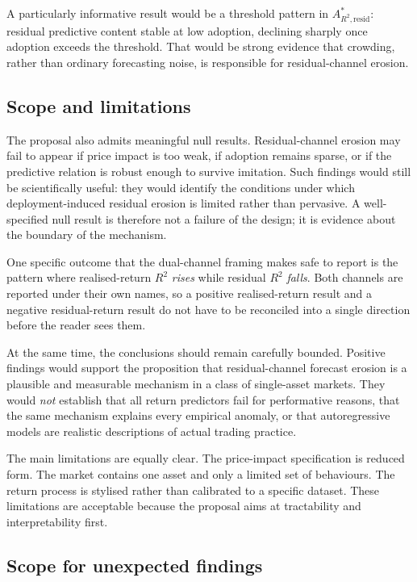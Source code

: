 \documentclass[11pt]{article}
\begin{document}
A particularly informative result would be a threshold pattern in $A^{*}_{R^{2},\mathrm{resid}}$: residual predictive content stable at low adoption, declining sharply once adoption exceeds the threshold. That would be strong evidence that crowding, rather than ordinary forecasting noise, is responsible for residual-channel erosion.

\subsection{Scope and limitations}

The proposal also admits meaningful null results. Residual-channel erosion may fail to appear if price impact is too weak, if adoption remains sparse, or if the predictive relation is robust enough to survive imitation. Such findings would still be scientifically useful: they would identify the conditions under which deployment-induced residual erosion is limited rather than pervasive. A well-specified null result is therefore not a failure of the design; it is evidence about the boundary of the mechanism.

One specific outcome that the dual-channel framing makes safe to report is the pattern where realised-return $R^{2}$ \emph{rises} while residual $R^{2}$ \emph{falls}. Both channels are reported under their own names, so a positive realised-return result and a negative residual-return result do not have to be reconciled into a single direction before the reader sees them.

At the same time, the conclusions should remain carefully bounded. Positive findings would support the proposition that residual-channel forecast erosion is a plausible and measurable mechanism in a class of single-asset markets. They would \emph{not} establish that all return predictors fail for performative reasons, that the same mechanism explains every empirical anomaly, or that autoregressive models are realistic descriptions of actual trading practice.

The main limitations are equally clear. The price-impact specification is reduced form. The market contains one asset and only a limited set of behaviours. The return process is stylised rather than calibrated to a specific dataset. These limitations are acceptable because the proposal aims at tractability and interpretability first.

\subsection{Scope for unexpected findings}
\end{document}
